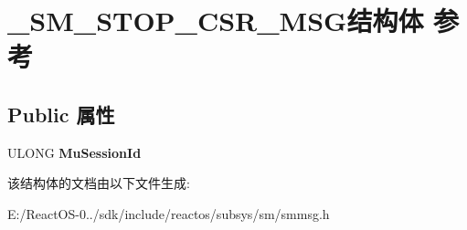 \hypertarget{struct___s_m___s_t_o_p___c_s_r___m_s_g}{}\section{\+\_\+\+S\+M\+\_\+\+S\+T\+O\+P\+\_\+\+C\+S\+R\+\_\+\+M\+S\+G结构体 参考}
\label{struct___s_m___s_t_o_p___c_s_r___m_s_g}
\subsection*{Public 属性}
\begin{DoxyCompactItemize}
\item 
\mbox{\label{struct___s_m___s_t_o_p___c_s_r___m_s_g_ae580a11f3a826a064d2c7f42eaf128f7}} 
U\+L\+O\+NG {\bfseries Mu\+Session\+Id}
\end{DoxyCompactItemize}


该结构体的文档由以下文件生成\+:\begin{DoxyCompactItemize}
\item 
E\+:/\+React\+O\+S-\/0../sdk/include/reactos/subsys/sm/smmsg.\+h\end{DoxyCompactItemize}
